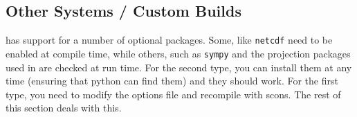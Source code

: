 \begin{comment}
\subsubsection{Release 10.0}

Install the following packages:
\begin{itemize}
 \item python
 \item scons
 \item boost-python-libs
 \item bash
 \item netcdf
 \item silo
 \item py27-scipy
 \item py27-gdal
 \item py27-matplotlib
 \item py27-pyproj
 \item py27-sympy
\end{itemize}

\noindent Next choose (or create) your options file.
For the setup as above the escript source comes with a prepared file in
\texttt{scons/templates/freebsd10.0_options.py}.
Finally to build escript issue the following in the escript source directory
(replace the options file as required):
\begin{shellCode}
scons -j1 options_file=scons/templates/freebsd10.0_options.py
\end{shellCode}

\emph{Note:} Some packages installed above are built with gcc 4.7. Somewhere
in the toolchain a system-installed gcc library is pulled in which is
incompatible with the one from version 4.7 and would prevent escript from
executing successfully. As explained in the FreeBSD
documentation\footnote{see \url{http://www.freebsd.org/doc/en/articles/custom-gcc/article.html}}
this can be fixed by adding a line to \texttt{/etc/libmap.conf}:
\begin{shellCode}
libgcc_s.so.1 gcc47/libgcc_s.so.1
\end{shellCode}

\end{comment}
\subsection{Other Systems / Custom Builds}\label{sec:othersrc}

\escript has support for a number of optional packages.
Some, like \texttt{netcdf} need to be enabled at compile time, while others, such as \texttt{sympy} and the projection packages
used in \downunder are checked at run time.
For the second type, you can install them at any time (ensuring that python can find them) and they should work.
For the first type, you need to modify the options file and recompile with scons.
The rest of this section deals with this.

